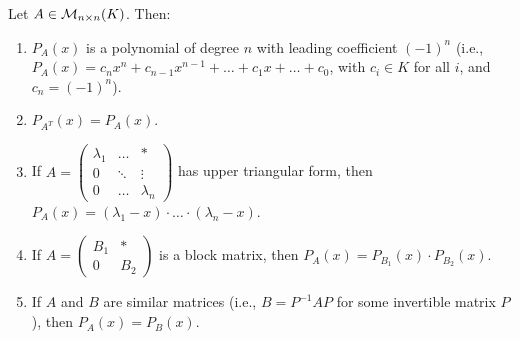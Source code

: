 \begin{lemma}\label{lem:properties_char_poly}
  Let $A \in \mathcal{M}_{n \times n}(K)$. Then:
  \begin{enumerate}
    \item $P_A(x)$ is a polynomial of degree $n$ with leading coefficient $(-1)^n$ (i.e., $P_A(x) = c_n x^n + c_{n-1} x^{n-1} + \dots + c_1 x + \dots + c_0$, with $c_i \in K$ for all $i$, and $c_n = (-1)^n$).
    \item $P_{A^T}(x) = P_A(x)$.
    \item If $A = \begin{pmatrix} \lambda_1 & \dots & * \\ 0 & \ddots & \vdots \\ 0 & \dots & \lambda_n \end{pmatrix}$ has upper triangular form, then $P_A(x) = (\lambda_1 - x) \cdot \dots \cdot (\lambda_n - x)$.
    \item If $A = \left(\begin{array}{c|c} B_1 & * \\ \hline 0 & B_2 \end{array}\right)$ is a block matrix, then $P_A(x) = P_{B_1}(x) \cdot P_{B_2}(x)$.
    \item If $A$ and $B$ are similar matrices (i.e., $B = P^{-1}AP$ for some invertible matrix $P$), then $P_A(x) = P_B(x)$.
  \end{enumerate}
\end{lemma}

